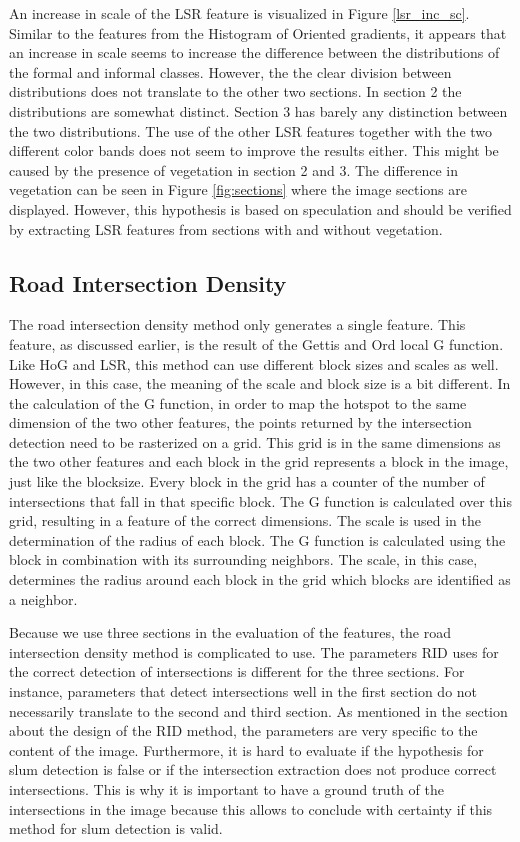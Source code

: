 An increase in scale of the LSR feature is visualized in Figure
\ref{lsr_inc_sc}. Similar to the features from the Histogram of Oriented gradients, it appears
that an increase in scale seems to increase the difference between the
distributions of the formal and informal classes.  However, the the clear
division between distributions does not translate to the other two sections. In
section 2 the distributions are somewhat distinct. Section 3 has barely any
distinction between the two distributions. The use of the other LSR features
together with the two different color bands does not seem to improve the results either. This might be caused by the presence of vegetation in section 2 and 3. The difference in vegetation can
be seen in Figure \ref{fig:sections} where the image sections are displayed. However, this hypothesis is based on speculation and should be verified by extracting LSR features from sections with and without vegetation.

\subsection{Road Intersection Density}

The road intersection density method only generates a single feature. This feature, as discussed earlier, is the result of the Gettis and Ord local G function. Like HoG and LSR, this method can use different block sizes and scales as well. However, in this case, the meaning of the scale and block size is a bit different. In the calculation of the G function, in order to map the hotspot to the same dimension of the two other features, the points returned by the intersection detection need to be rasterized on a grid. This grid is in the same dimensions as the two other features and each block in the grid represents a block in the image, just like the blocksize. Every block in the grid has a counter of the number of intersections that fall in that specific block. The G function is calculated over this grid, resulting in a feature of the correct dimensions. The scale is used in the determination of the radius of each block. The G function is calculated using the block in combination with its surrounding neighbors. The scale, in this case, determines the radius around each block in the grid which blocks are identified as a neighbor.

Because we use three sections in the evaluation of the features, the road intersection density method is complicated to use. The parameters RID uses for the correct detection of intersections is different for the three sections. For instance, parameters that detect intersections well in the first section do not necessarily translate to the second and third section. As mentioned in the section about the design of the RID method, the parameters are very specific to the content of the image. Furthermore, it is hard to evaluate if the hypothesis for slum detection is false or if the intersection extraction does not produce correct intersections. This is why it is important to have a ground truth of the intersections in the image because this allows to conclude with certainty if this method for slum detection is valid.

